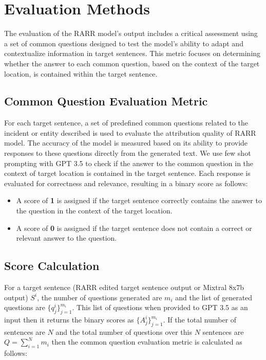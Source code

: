 \documentclass[11pt]{article}
\begin{document}
	\section{Evaluation Methods}
	The evaluation of the RARR model's output includes a critical assessment using a set of common questions designed to test the model's ability to adapt and contextualize information in target sentences. This metric focuses on determining whether the answer to each common question, based on the context of the target location, is contained within the target sentence. 
	
	\subsection{Common Question Evaluation Metric}
	
	For each target sentence, a set of predefined common questions related to the incident or entity described is used to evaluate the attribution quality of RARR model. The accuracy of the model is measured based on its ability to provide responses to these questions directly from the generated text. We use few shot prompting with GPT 3.5 to check if the answer to the common question in the context of target location is contained in the target sentence. Each response is evaluated for correctness and relevance, resulting in a binary score as follows:
	
	\begin{itemize}
		\item A score of \textbf{1} is assigned if the target sentence correctly contains the answer to the question in the context of the target location.
		\item A score of \textbf{0} is assigned if the target sentence does not contain a correct or relevant answer to the question.
	\end{itemize}
	
	\subsection{Score Calculation}
	
	For a target sentence (RARR edited target sentence output or Mixtral 8x7b output) $S^i$, the number of questions generated are $m_i$ and the list of generated questions are $\{q_j^i\}_{j=1}^{m_i}$. This list of questions when provided to GPT 3.5 as an input then it returns the binary scores as $\{A_j^i\}_{j=1}^{m_i}$. If the total number of sentences are $N$ and the total number of questions over this $N$ sentences are $Q = \sum_{i=1}^N m_i$ then the common question evaluation metric is calculated as follows:
	
\end{document}
